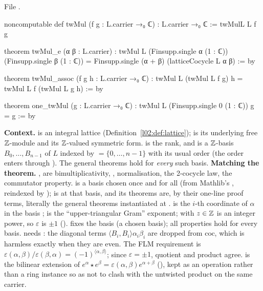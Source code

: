 File .
\begin{leancode}
noncomputable def twMul (f g : L.carrier →₀ ℂ) : L.carrier →₀ ℂ := twMulL L f g

theorem twMul_e (α β : L.carrier) :
    twMul L (Finsupp.single α (1 : ℂ)) (Finsupp.single β (1 : ℂ))
      = Finsupp.single (α + β) (latticeCocycle L α β) := by

theorem twMul_assoc (f g h : L.carrier →₀ ℂ) :
    twMul L (twMul L f g) h = twMul L f (twMul L g h) := by

theorem one_twMul (g : L.carrier →₀ ℂ) : twMul L (Finsupp.single 0 (1 : ℂ)) g = g := by
\end{leancode}

\begin{dictionary}
\textbf{Context.}  is an integral lattice (Definition~\ref{l02:def:lattice});
 is its underlying free ${\mathbb{Z}}$-module and  its ${\mathbb{Z}}$-valued symmetric form.  is
the rank, and  is a ${\mathbb{Z}}$-basis $B_0,\dots,B_{n-1}$ of $L$ indexed by
 $=\{0,\dots,n-1\}$ with its usual order (the order enters through ). The general
theorems hold for \emph{every} such basis. \textbf{Matching the theorem.} ,
 are bimultiplicativity, , 
normalisation,  the 2-cocycle law,  the commutator property.
 is a basis chosen once and for all (from Mathlib's ,
reindexed by );  is  at that basis, and its theorems are, by their
one-line proof terms, literally the general theorems instantiated at .
 is the $i$-th coordinate of $\alpha$ in the basis ;  is the
``upper-triangular Gram'' exponent;  with $z\in{\mathbb{Z}}$ is an integer power, so $\varepsilon$ is
$\pm1$ ().  fixes the basis  (a chosen basis);
all properties hold for every basis.  needs : the diagonal terms
$\langle B_i,B_i\rangle\alpha_i\beta_i$ are dropped from $\mathrm{coc}$, which is harmless exactly when they are even.
The FLM requirement is $\varepsilon(\alpha,\beta)/\varepsilon(\beta,\alpha) = (-1)^{\langle\alpha,\beta\rangle}$; since $\varepsilon=\pm1$,
quotient and product agree.  is the bilinear extension of
$e^\alpha\star e^\beta = \varepsilon(\alpha,\beta)e^{\alpha+\beta}$ (), kept as an operation rather than a
ring instance so as not to clash with the untwisted product on the same carrier.
\end{dictionary}

